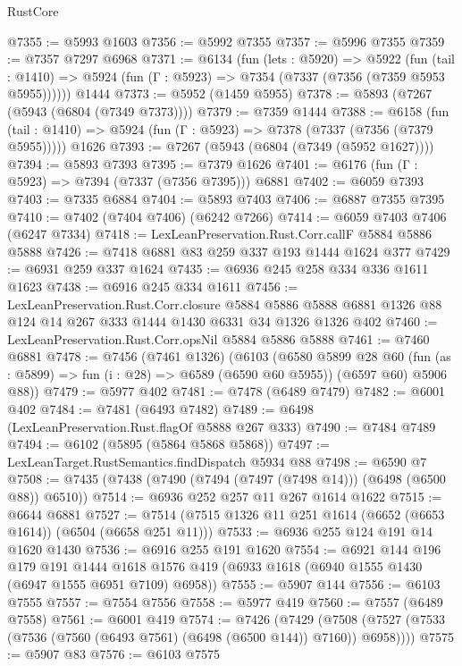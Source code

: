 \begin{lexlean}{RustCore}
\begin{coremodule}
@7355 := @5993 @1603
@7356 := @5992 @7355
@7357 := @5996 @7355
@7359 := @7357 @7297 @6968
@7371 := @6134
    (fun (lets : @5920) =>
    @5922
      (fun (tail : @1410) => @5924 (fun (Γ : @5923) => @7354 (@7337 (@7356 (@7359 @5953 @5955))))))
    @1444
@7373 := @5952 (@1459 @5955)
@7378 := @5893 (@7267 (@5943 (@6804 (@7349 @7373))))
@7379 := @7359 @1444
@7388 := @6158
    (fun (tail : @1410) => @5924 (fun (Γ : @5923) => @7378 (@7337 (@7356 (@7379 @5955)))))
    @1626
@7393 := @7267 (@5943 (@6804 (@7349 (@5952 @1627))))
@7394 := @5893 @7393
@7395 := @7379 @1626
@7401 := @6176 (fun (Γ : @5923) => @7394 (@7337 (@7356 @7395))) @6881
@7402 := @6059 @7393
@7403 := @7335 @6884
@7404 := @5893 @7403
@7406 := @6887 @7355 @7395
@7410 := @7402 (@7404 @7406) (@6242 @7266)
@7414 := @6059 @7403 @7406 (@6247 @7334)
@7418 := LexLeanPreservation.Rust.Corr.callF @5884 @5886 @5888
@7426 := @7418 @6881 @83 @259 @337 @193 @1444 @1624 @377
@7429 := @6931 @259 @337 @1624
@7435 := @6936 @245 @258 @334 @336 @1611 @1623
@7438 := @6916 @245 @334 @1611
@7456 := LexLeanPreservation.Rust.Corr.closure
    @5884
    @5886
    @5888
    @6881
    @1326
    @88
    @124
    @14
    @267
    @333
    @1444
    @1430
    @6331
    @34
    @1326
    @1326
    @402
@7460 := LexLeanPreservation.Rust.Corr.opsNil @5884 @5886 @5888
@7461 := @7460 @6881
@7478 := @7456
    (@7461 @1326)
    (@6103
      (@6580
        @5899
        @28
        @60
        (fun (as : @5899) => fun (i : @28) => @6589 (@6590 @60 @5955))
        (@6597 @60)
        @5906
        @88))
@7479 := @5977 @402
@7481 := @7478 (@6489 @7479)
@7482 := @6001 @402
@7484 := @7481 (@6493 @7482)
@7489 := @6498 (LexLeanPreservation.Rust.flagOf @5888 @267 @333)
@7490 := @7484 @7489
@7494 := @6102 (@5895 (@5864 @5868 @5868))
@7497 := LexLeanTarget.RustSemantics.findDispatch @5934 @88
@7498 := @6590 @7
@7508 := @7435 (@7438 (@7490 (@7494 (@7497 (@7498 @14))) (@6498 (@6500 @88)) @6510))
@7514 := @6936 @252 @257 @11 @267 @1614 @1622
@7515 := @6644 @6881
@7527 := @7514 (@7515 @1326 @11 @251 @1614 (@6652 (@6653 @1614)) (@6504 (@6658 @251 @11)))
@7533 := @6936 @255 @124 @191 @14 @1620 @1430
@7536 := @6916 @255 @191 @1620
@7554 := @6921
    @144
    @196
    @179
    @191
    @1444
    @1618
    @1576
    @419
    (@6933 @1618 (@6940 @1555 @1430 (@6947 @1555 @6951 @7109) @6958))
@7555 := @5907 @144
@7556 := @6103 @7555
@7557 := @7554 @7556
@7558 := @5977 @419
@7560 := @7557 (@6489 @7558)
@7561 := @6001 @419
@7574 := @7426
    (@7429 (@7508 (@7527 (@7533 (@7536 (@7560 (@6493 @7561) (@6498 (@6500 @144)) @7160)) @6958))))
@7575 := @5907 @83
@7576 := @6103 @7575

\end{coremodule}
\end{lexlean}
